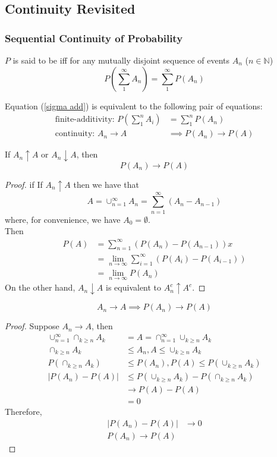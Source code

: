 \documentclass[11pt]{article}
\numberwithin{equation}{section}
\begin{document}
\subsection{Continuity Revisited}
\subsubsection{Sequential Continuity of Probability}
 $P$ is said to be  iff
for any mutually disjoint sequence of events $A_n$ ($n \in \mathbb{N}$)
\begin{equation} \label{sigma add}
	P(\sum_1^\infty A_n) = \sum_1^\infty P(A_n)
\end{equation}

\remark Equation (\ref{sigma add}) is equivalent to the following pair of equations:
\begin{align}
	\text{finite-additivity: } P(\sum_1^nA_i) &= \sum_1^n P(A_n) \\
	\text{continuity: }A_n \rightarrow A &\implies P(A_n) \rightarrow P(A)
\end{align}

\proposition
If $A_n \uparrow A$ or $A_n \downarrow A$, then
$$P(A_n) \rightarrow P(A)$$
\begin{proof}
	if If $A_n \uparrow A$ then we have that 
	$$ A = \cup_{n=1}^\infty A_n = \sum_{n=1}^\infty (A_n - A_{n-1})$$
	where, for convenience, we have $A_0 = \emptyset$. \\
	Then
	\begin{align}
		P(A) &= \sum_{n=1}^\infty (P(A_n) - P(A_{n-1}))x  \\
		&= \lim_{n \rightarrow \infty}\sum_{i=1}^\infty (P(A_i) - P(A_{i-1})) \\
		&= \lim_{n \rightarrow \infty} P(A_n)
	\end{align}
	On the other hand, $A_n \downarrow A$ is equivalent to $A_n^c \uparrow A^c$.
\end{proof}

\begin{equation}
	A_n \rightarrow A \implies P(A_n) \rightarrow P(A)
\end{equation}
\begin{proof}
	Suppose $A_n \rightarrow A$, then
	\begin{align}
		\cup_{n=1}^\infty\cap_{k\geq n}A_k &= A = \cap_{n=1}^\infty\cup_{k\geq n}A_k \\
		\cap_{k\geq n}A_k &\leq A_n, A \leq \cup_{k\geq n}A_k \\
		P(\cap_{k\geq n}A_k) &\leq P(A_n), P(A) \leq P(\cup_{k\geq n}A_k) \\
		|P(A_n) - P(A)| & \leq P(\cup_{k\geq n}A_k) - P(\cap_{k\geq n}A_k) \\
		& \rightarrow P(A) - P(A) \\
		&= 0
	\end{align}
	Therefore, 
	\begin{align}
		|P(A_n) - P(A)| &\rightarrow 0 \\
		P(A_n) \rightarrow P(A)
	\end{align}
\end{proof}
\end{document}
